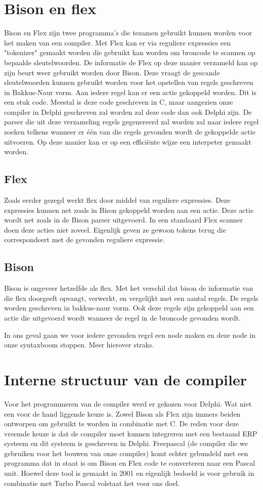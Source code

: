 \documentclass[11pt,a4paper]{article}
\begin{document}
\section{Bison en flex}
Bison en Flex zijn twee programma's die tezamen gebruikt kunnen worden voor het maken van een compiler. Met Flex kan er via reguliere expressies een "tokenizer" gemaakt worden die gebruikt kan worden om broncode te scannen op bepaalde sleutelwoorden. De informatie de Flex op deze manier verzameld kan op zijn beurt weer gebruikt worden door Bison. Deze vraagt de gescande sleutelwoorden kunnen gebruikt worden voor het opstellen van regels geschreven in Bakkus-Naur vorm. Aan iedere regel kan er een actie gekoppeld worden. Dit is een stuk code. Meestal is deze code geschreven in C, maar aangezien onze compiler in Delphi geschreven zal worden zal deze code dan ook Delphi zijn. De parser die uit deze verzameling regels gegenereerd zal worden zal naar iedere regel zoeken telkens wanneer er één van die regels gevonden wordt de gekoppelde actie uitvoeren. Op deze manier kan er op een efficiënte wijze een interpeter gemaakt worden.

\subsection{Flex}
Zoals eerder gezegd werkt flex door middel van reguliere expressies. Deze expressies kunnen net zoals in Bison gekoppeld worden aan een actie. Deze actie wordt net zoals in de Bison parser uitgevoerd. In een standaard Flex scanner doen deze acties niet zoveel. Eigenlijk geven ze gewoon tokens terug die correspondeert met de gevonden reguliere expressie. 

\subsection{Bison}
Bison is ongeveer hetzelfde als flex. Met het verschil dat bison de informatie van die flex doorgeeft opvangt, verwerkt, en vergelijkt met een aantal regels. De regels worden geschreven in bakkus-naur vorm. Ook deze regels zijn gekoppeld aan een actie die uitgevoerd wordt wanneer de regel in de broncode gevonden wordt.

In ons geval gaan we voor iedere gevonden regel een node maken en deze node in onze syntaxboom stoppen. Meer hierover straks.

\section{Interne structuur van de compiler}
Voor het programmeren van de compiler werd er gekozen voor Delphi. Wat niet een voor de hand liggende keuze is. Zowel Bison als Flex zijn immers beiden ontworpen om gebruikt te worden in combinatie met C. De reden voor deze vreemde keuze is dat de compiler moet kunnen integreren met een bestaand ERP systeem en dit systeem is geschreven in Delphi. Freepascal (de compiler die we gebruiken voor het bouwen van onze compiler) komt echter gebundeld met een programma dat in staat is om Bison en Flex code te converteren naar een Pascal unit. Hoewel deze tool is gemaakt in 2001 en eigenlijk bedoeld is voor gebruik in combinatie met Turbo Pascal volstaat het voor ons doel.
\end{document}
